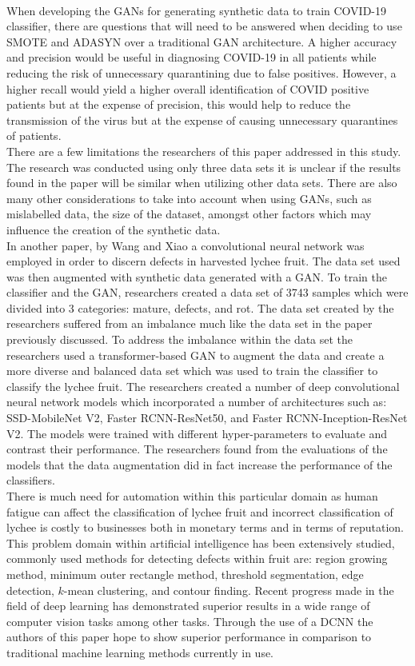 \\
When developing the GANs for generating synthetic data to train COVID-19 classifier, there are questions that will need to  be answered when deciding to use SMOTE and ADASYN over a traditional GAN architecture.  A higher accuracy and precision would be useful in diagnosing COVID-19 in all patients while reducing the risk of unnecessary quarantining due to false positives.  However, a higher recall would yield a higher overall identification of COVID positive patients but at the expense of precision, this would help to reduce the transmission of the virus but at the expense of causing unnecessary quarantines of patients.
 \\
There are a few limitations the researchers of this paper addressed in this study.  The research was conducted using only three data sets it is unclear if the results found in the paper will be similar when utilizing other data sets.  There are also many other considerations to take into account when using GANs, such as mislabelled data, the size of the dataset, amongst other factors which may influence the creation of the synthetic data.
\\
In another paper, by Wang and Xiao\cite{litReviewLychee} a convolutional neural network was employed in order to discern defects in harvested lychee fruit.  The data set used was then augmented with synthetic data generated with a GAN.  To train the classifier and the GAN, researchers created a data set of 3743 samples which were divided into 3 categories: mature, defects, and rot.  The data set created by the researchers suffered from an imbalance much like the data set in the paper previously discussed\cite{litReviewGanDataAugmentation}.  To address the imbalance within the data set the researchers used a transformer-based GAN to augment the data and create a more diverse and balanced data set which was used to train the classifier to classify the lychee fruit.  The researchers created a number of deep convolutional neural network models which incorporated a number of architectures such as: SSD-MobileNet V2, Faster RCNN-ResNet50, and Faster RCNN-Inception-ResNet V2.  The models were trained with different hyper-parameters to evaluate and contrast their performance.  The researchers found from the evaluations of the models that the data augmentation did in fact increase the performance of the classifiers.
\\
There is much need for automation within this particular domain as human fatigue can affect the classification of lychee fruit and incorrect classification of lychee is costly to businesses both in monetary terms and in terms of reputation.  This problem domain within artificial intelligence has been extensively studied, commonly used methods for detecting defects within fruit are: region growing method, minimum outer rectangle method, threshold segmentation, edge detection, $k$-mean clustering, and contour finding\cite{litReviewLychee}.  Recent progress made in the field of deep learning has demonstrated superior results in a wide range of computer vision tasks among other tasks.  Through the use of a DCNN the authors of this paper \cite{litReviewLychee} hope to show superior performance in comparison to traditional machine learning methods currently in use.
